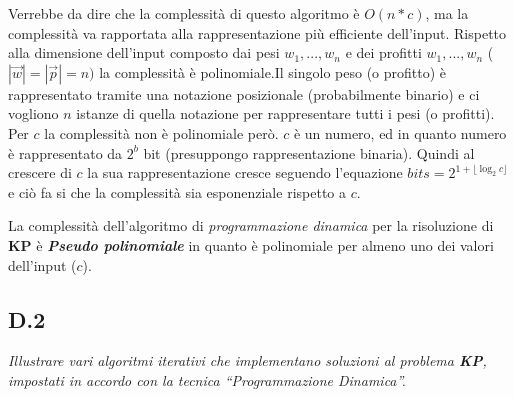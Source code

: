 \documentclass[a4paper]{article}
\newcommand{\imp}[1]{\textbf{\textit{#1}}}
\begin{document}
Verrebbe da dire che la complessità di questo algoritmo è $O(n*c)$, ma la complessità va rapportata alla rappresentazione più efficiente dell'input.
Rispetto alla dimensione dell'input composto dai pesi $w_1, ..., w_n$ e dei profitti $w_1, ... , w_n$ ($| \vec w | = | \vec p | = n)$ la complessità è polinomiale.Il singolo peso (o profitto) è rappresentato tramite una notazione posizionale (probabilmente binario) e ci vogliono $n$ istanze di quella notazione per rappresentare tutti i pesi (o profitti).\\
Per $c$ la complessità non è polinomiale però. $c$ è un numero, ed in quanto numero è rappresentato da $2^b$ bit (presuppongo rappresentazione binaria).
Quindi al crescere di $c$ la sua rappresentazione cresce seguendo l'equazione $bits = 2^{1 + \lfloor \log_2c \rfloor}$ e ciò fa si che la complessità sia esponenziale rispetto a $c$.

La complessità dell'algoritmo di \textit{programmazione dinamica} per la risoluzione di \textbf{KP} è \imp{Pseudo polinomiale} in quanto è polinomiale per almeno uno dei valori dell'input ($c$).

\subsection{D.2}
\emph{Illustrare vari algoritmi iterativi che implementano soluzioni al problema \textbf{KP}, impostati in accordo con la tecnica “Programmazione Dinamica”.}
\end{document}
